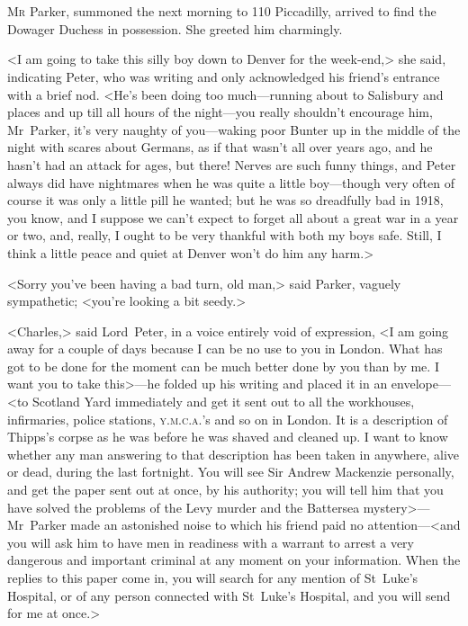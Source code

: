 \chapter[Chapter \thechapter]{}
\lettrine[lines=4]{M}{r} Parker, summoned the next morning to 110 Piccadilly, arrived to find the Dowager Duchess in possession. She greeted him charmingly.

\zz
<I am going to take this silly boy down to Denver for the week-end,> she said, indicating Peter, who was writing and only acknowledged his friend's entrance with a brief nod. <He's been doing too much—running about to Salisbury and places and up till all hours of the night—you really shouldn't encourage him, Mr~Parker, it's very naughty of you—waking poor Bunter up in the middle of the night with scares about Germans, as if that wasn't all over years ago, and he hasn't had an attack for ages, but there! Nerves are such funny things, and Peter always did have nightmares when he was quite a little boy—though very often of course it was only a little pill he wanted; but he was so dreadfully bad in 1918, you know, and I suppose we can't expect to forget all about a great war in a year or two, and, really, I ought to be very thankful with both my boys safe. Still, I think a little peace and quiet at Denver won't do him any harm.>

<Sorry you've been having a bad turn, old man,> said Parker, vaguely sympathetic; <you're looking a bit seedy.>

<Charles,> said Lord~Peter, in a voice entirely void of expression, <I am going away for a couple of days because I can be no use to you in London. What has got to be done for the moment can be much better done by you than by me. I want you to take this>—he folded up his writing and placed it in an envelope—<to Scotland Yard immediately and get it sent out to all the workhouses, infirmaries, police stations, \textsc{y.m.c.a.}'s and so on in London. It is a description of Thipps's corpse as he was before he was shaved and cleaned up. I want to know whether any man answering to that description has been taken in anywhere, alive or dead, during the last fortnight. You will see Sir Andrew Mackenzie personally, and get the paper sent out at once, by his authority; you will tell him that you have solved the problems of the Levy murder and the Battersea mystery>—Mr~Parker made an astonished noise to which his friend paid no attention—<and you will ask him to have men in readiness with a warrant to arrest a very dangerous and important criminal at any moment on your information. When the replies to this paper come in, you will search for any mention of St~Luke's Hospital, or of any person connected with St~Luke's Hospital, and you will send for me at once.>


